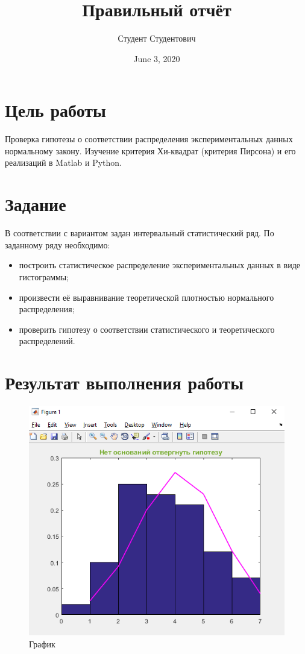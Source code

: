 \documentclass[a4paper,14pt]{article}
\begin{document}
\title{\Large{\textbf{Правильный отчёт}}}
\author{Студент Студентович}
\date{June 3, 2020}

\maketitle


\section{Цель работы}

Проверка гипотезы о соответствии распределения экспериментальных данных нормальному закону. Изучение критерия Хи-квадрат (критерия Пирсона) и его реализаций в Matlab и Python.

\section{Задание}

В соответствии с вариантом задан интервальный статистический ряд. По заданному ряду необходимо:
\begin{itemize}
	\item построить статистическое распределение экспериментальных данных в виде гистограммы;
	\item произвести её выравнивание теоретической плотностью нормального распределения;
	\item проверить гипотезу о соответствии статистического и теоретического распределений.
\end{itemize}

\section{Результат выполнения работы}

\begin{figure}[H] %
	\centering
	\includegraphics{img1.png} %
	\caption{График}
\end{figure}
\end{document}
